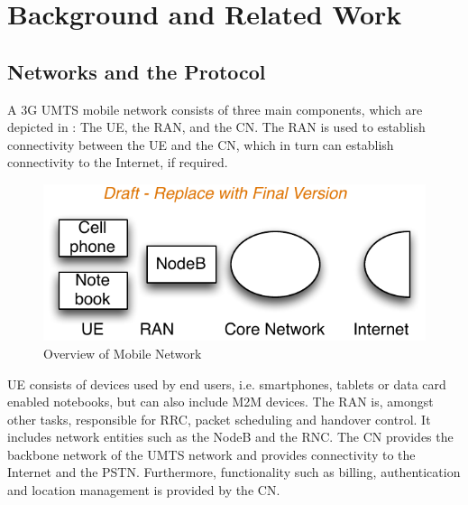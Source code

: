 \section{Background and Related Work}\label{sec:network:background}

\subsection{ Networks and the  Protocol}\label{sec:network:background:umts_rrc}
A \gls{3G} \gls{UMTS} mobile network consists of three main components, which are depicted in : The \gls{UE}, the \gls{RAN}, and the \gls{CN}.
The \gls{RAN} is used to establish connectivity between the \gls{UE} and the \gls{CN}, which in turn can establish connectivity to the Internet, if required.

\begin{figure}
	\centering
	\includegraphics{network/background/figures/mobile_network_overview}
	\caption{Overview of Mobile Network}
	\label{fig:network:background:mobile_network_overview}
\end{figure}

\gls{UE} consists of devices used by end users, i.e. smartphones, tablets or data card enabled notebooks, but can also include \gls{M2M} devices.
The \gls{RAN} is, amongst other tasks, responsible for \gls{RRC}, packet scheduling and handover control.
It includes network entities such as the \gls{NodeB} and the \gls{RNC}.
The \gls{CN} provides the backbone network of the \gls{UMTS} network and provides connectivity to the Internet and the \gls{PSTN}.
Furthermore, functionality such as billing, authentication and location management is provided by the \gls{CN}.


